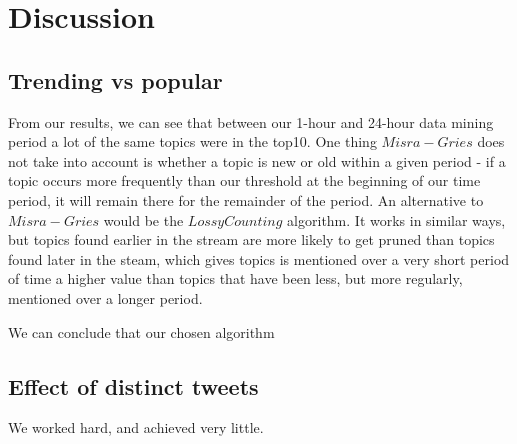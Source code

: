 \section{Discussion}\label{conclusions}

\subsection{Trending vs popular}\label{trending-discussion}
From our results, we can see that between our 1-hour and 24-hour data mining period a lot of the same topics were in the top10. One thing $Misra-Gries$ does not take into account is whether a topic is new or old within a given period - if a topic occurs more frequently than our threshold at the beginning of our time period, it will remain there for the remainder of the period. An alternative to $Misra-Gries$ would be the $Lossy Counting$ algorithm. It works in similar ways, but topics found earlier in the stream are more likely to get pruned than topics found later in the steam, which gives topics is mentioned over a very short period of time a higher value than topics that have been less, but more regularly, mentioned over a longer period.

We can conclude that our chosen algorithm 

\subsection{Effect of distinct tweets}\label{trending-distinct}

We worked hard, and achieved very little.